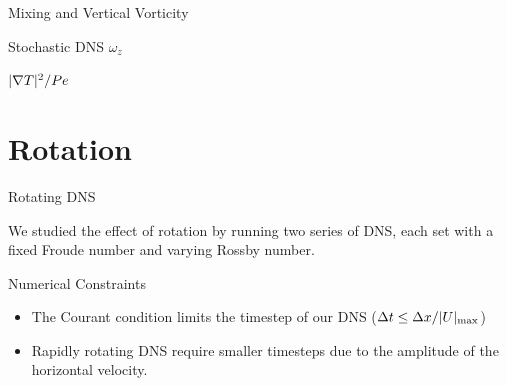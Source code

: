 \documentclass{beamer}
\begin{document}
\begin{frame}{Mixing and Vertical Vorticity }

        {\footnotesize\citep{Garaudal2024}}

        \vspace{100pt}

        {\footnotesize Stochastic DNS}
    \emp
        \centering
        $\omega_z$
        
    \emp
        \centering
        $|\nabla T|^2/Pe$
        
    \emp
    
\end{frame}

\section{Rotation}

\begin{frame}{Rotating DNS}

We studied the effect of rotation by running two series of DNS, each set with a fixed Froude number and varying Rossby number. 
    
\end{frame}

\begin{frame}{Numerical Constraints}
    \begin{itemize}
        \item The Courant condition limits the timestep of our DNS ($\Delta t \le \Delta x/|U|_{\rm max}$)
        \item Rapidly rotating DNS require smaller timesteps due to the amplitude of the horizontal velocity. 
    \end{itemize}
\end{frame}
 
\end{document}
